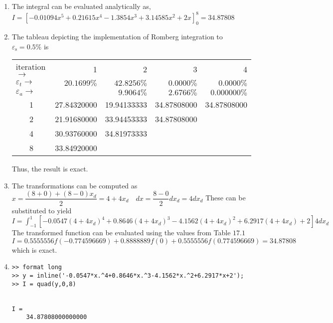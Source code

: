 \documentclass[../main.tex]{subfiles}
\begin{document}
\section{}
\begin{enumerate}[label=\bfseries(\alph*)]
\item The integral can be evaluated analytically as,
	\bigbreak
$\displaystyle I=\left[-0.01094 x^{5}+0.21615 x^{4}-1.3854 x^{3}+3.14585 x^{2}+2 x\right]_{0}^{8}=34.87808$
	\bigbreak
\item The tableau depicting the implementation of Romberg integration to $\varepsilon_{\mathrm{s}}=0.5 \%$ is
	\bigbreak
\begin{tabular}{lrrrr}
iteration $\rightarrow$ & 1 & 2 & 3 & 4\\
$\varepsilon_{t} \rightarrow$ & $20.1699\%$ & $42.8256\%$ & $0.0000\%$ & $0.0000\%$\\
$\varepsilon_{a} \rightarrow$ &  & $9.9064\%$ & $2.6766\%$ & $0.000000\%$\\
\multicolumn{1}{c}{1}&27.84320000&19.94133333&34.87808000&34.87808000\\
\multicolumn{1}{c}{2}&21.91680000&33.94453333&34.87808000\\
\multicolumn{1}{c}{4}&30.93760000&34.81973333\\
\multicolumn{1}{c}{8}&33.84920000&\\
\end{tabular}
	\bigbreak
Thus, the result is exact.
	\bigbreak
\item The transformations can be computed as
	\bigbreak
$x=\dfrac{(8+0)+(8-0) x_{d}}{2}=4+4 x_{d} \quad d x=\dfrac{8-0}{2} d x_{d}=4 d x_{d}$
	\bigbreak
These can be substituted to yield
	\bigbreak
$\displaystyle I=\int_{-1}^{1}\left[-0.0547\left(4+4 x_{d}\right)^{4}+0.8646\left(4+4 x_{d}\right)^{3}-4.1562\left(4+4 x_{d}\right)^{2}+6.2917\left(4+4 x_{d}\right)+2\right] 4 d x_{d}$
	\bigbreak
The transformed function can be evaluated using the values from Table $17.1$
	\bigbreak
$I=0.5555556 f(-0.774596669)+0.8888889 f(0)+0.5555556 f(0.774596669)=34.87808$
	\bigbreak
which is exact.
	\bigbreak
\item
\begin{lstlisting}[numbers=none]
>> format long
>> y = inline('-0.0547*x.^4+0.8646*x.^3-4.1562*x.^2+6.2917*x+2');
>> I = quad(y,0,8)


I =
	34.87808000000000
\end{lstlisting}
\end{enumerate}
	\bigbreak
\end{document}
